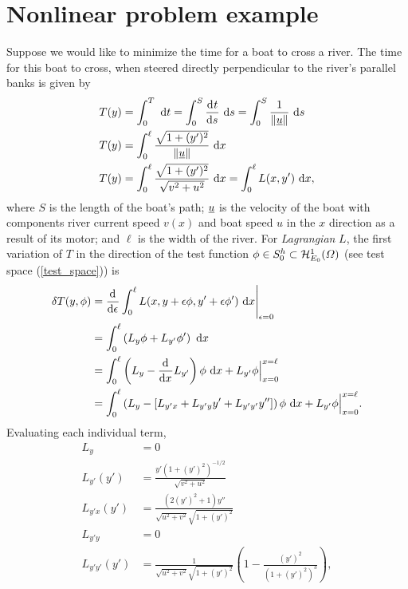 \section{Nonlinear problem example}

Suppose we would like to minimize the time for a boat to cross a river.  The time for this boat to cross, when steered directly perpendicular to the river's parallel banks is given by
\begin{align*}
  T(y) &= \int_0^T \ \mathrm{d}t = \int_0^S \frac{\mathrm{d}^{} t}{\mathrm{d} s^{} } \ \mathrm{d}s = \int_0^S \frac{1}{\Vert \underline{u}\Vert} \ \mathrm{d}s \\
  T(y) &= \int_0^{\ell} \frac{\sqrt{1 + (y')^2}}{\Vert \underline{u} \Vert} \ \mathrm{d}x \\
  T(y) &= \int_0^{\ell} \frac{\sqrt{1 + (y')^2}}{\sqrt{v^2 + u^2}} \ \mathrm{d}x = \int_0^{\ell} L(x,y') \ \mathrm{d}x,
\end{align*}
where $S$ is the length of the boat's path; $\underline{u}$ is the velocity of the boat with components river current speed $v(x)$ and boat speed $u$ in the $x$ direction as a result of its motor; and $\ell$ is the width of the river.  For \emph{Lagrangian} $L$, the first variation of $T$ in the direction of the test function $\phi \in S_0^h \subset \mathcal{H}_{E_0}^1(\varOmega)$ (see test space (\ref{test_space})) is
{\footnotesize
\begin{align*}
  \delta T(y,\phi) &= \frac{\mathrm{d}^{} }{\mathrm{d} \epsilon^{} } \int_0^{\ell} L(x, y + \epsilon \phi, y' + \epsilon \phi') \ \mathrm{d}x \Bigg|_{\epsilon = 0} \\
                   &= \int_0^{\ell} \left( L_y \phi + L_{y'} \phi' \right) \ \mathrm{d}x \\
                   &= \int_0^{\ell} \left( L_y - \frac{\mathrm{d}^{} }{\mathrm{d} x^{} } L_{y'} \right) \phi \ \mathrm{d}x + L_{y'} \phi \Big|_{x=0}^{x=\ell} \\
                   &= \int_0^{\ell} \left( L_y - \left[ L_{y'x} + L_{y'y} y' + L_{y'y'} y'' \right] \right) \phi \ \mathrm{d}x + L_{y'} \phi \Big|_{x=0}^{x=\ell}.
\end{align*}}
Evaluating each individual term,
\begin{align*}
  L_y          &= 0 \\
  L_{y'}(y')   &= \frac{y' \left(1 + (y')^2\right)^{-1/2}}{\sqrt{v^2 + u^2}} \\
  L_{y'x}(y')  &= \frac{\left(2(y')^2 + 1\right) y''}{\sqrt{u^2 + v^2} \sqrt{1 + (y')^2}} \\
  L_{y'y}      &= 0 \\
  L_{y'y'}(y') &= \frac{1}{\sqrt{u^2 + v^2} \sqrt{1 + (y')^2}} \left( 1 - \frac{(y')^2}{\left(1 + (y')^2\right)^3} \right),
\end{align*}
